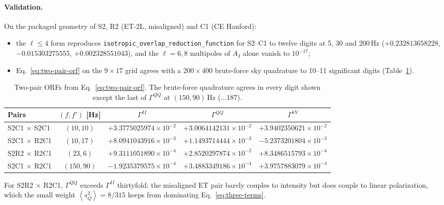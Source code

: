\documentclass[11pt]{article}
\newcommand{\avg}[1]{\left\langle #1 \right\rangle}
\theoremstyle{remark}
\begin{document}
\paragraph{Validation.}
On the packaged geometry of S2, R2 (ET-2L, misaligned) and C1 (CE Hanford):
\begin{itemize}
  \item the $\ell\le4$ form reproduces
        \texttt{isotropic\_overlap\_reduction\_function} for S2--C1 to twelve
        digits at 5, 30 and 200\,Hz ($+0.232813658228$, $-0.015303275555$,
        $+0.002328551043$), and the $\ell = 6, 8$ multipoles of $A_I$ alone
        vanish to $10^{-17}$;
  \item Eq.~\eqref{eq:two-pair-orf} on the $9\times17$ grid agrees with a
        $200\times400$ brute-force sky quadrature to 10--11 significant
        digits (Table~\ref{tab:two-pair}).
\end{itemize}

\begin{table}[ht]
  \centering
  \small
  \begin{tabular}{lcccc}
    \toprule
    Pairs & $(f, f')$ [Hz] & $\Gamma^{II}$ & $\Gamma^{QQ}$ & $\Gamma^{VV}$ \\
    \midrule
    S2C1 $\times$ S2C1 & $(10, 10)$
      & $+3.3775025974\times10^{-2}$ & $+3.0064142131\times10^{-2}$
      & $+3.9402350621\times10^{-2}$ \\
    S2C1 $\times$ R2C1 & $(10, 17)$
      & $+8.0941043916\times10^{-3}$ & $+1.1493714444\times10^{-3}$
      & $-5.2373201804\times10^{-3}$ \\
    S2R2 $\times$ R2C1 & $(23, 6)$
      & $+9.3111051890\times10^{-4}$ & $+2.8520297874\times10^{-2}$
      & $+8.3486515793\times10^{-4}$ \\
    S2C1 $\times$ R2C1 & $(150, 90)$
      & $-1.9235379575\times10^{-4}$ & $+3.4883349186\times10^{-4}$
      & $+3.9757883079\times10^{-4}$ \\
    \bottomrule
  \end{tabular}
  \caption{Two-pair ORFs from Eq.~\eqref{eq:two-pair-orf}. The brute-force
  quadrature agrees in every digit shown except the last of
  $\Gamma^{QQ}$ at $(150, 90)$\,Hz ($\ldots187$).}
  \label{tab:two-pair}
\end{table}

For S2R2 $\times$ R2C1, $\Gamma^{QQ}$ exceeds $\Gamma^{II}$ thirtyfold: the
misaligned ET pair barely couples to intensity but does couple to linear
polarization, which the small weight $\avg{s_Q^2} = 8/315$ keeps from
dominating Eq.~\eqref{eq:three-terms}.
\end{document}
